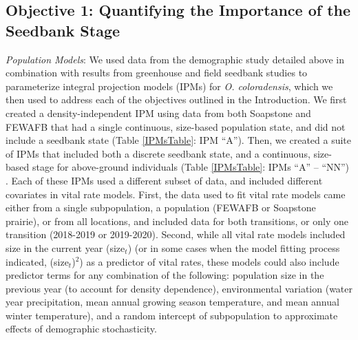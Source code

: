 \documentclass[12pt, letterpaper]{article}
\begin{document}
\subsection{Objective 1: Quantifying the Importance of the Seedbank Stage}

\textit{Population Models}: We used data from the demographic study detailed above in combination with results from greenhouse and field seedbank studies to parameterize integral projection models (IPMs) for \textit{O. coloradensis}, which we then used to address each of the objectives outlined in the Introduction. We first created a density-independent IPM using data from both Soapstone and FEWAFB that had a single continuous, size-based population state, and did not include a seedbank state (Table \ref{IPMsTable}: IPM “A”). Then, we created a suite of IPMs that included both a discrete seedbank state, and a continuous, size-based stage for above-ground individuals (Table \ref{IPMsTable}: IPMs “A” – “NN”) \cite{Ellner2006IntegralDemography, Rees2006, Paniw2017}.  Each of these IPMs used a different subset of data, and included different covariates in vital rate models. First, the data used to fit vital rate models came either from a single subpopulation, a population (FEWAFB or Soapstone prairie), or from all locations, and included data for both transitions, or only one transition (2018-2019 or 2019-2020). Second, while all vital rate models included size in the current year (size$_t$)  (or in some cases when the model fitting process indicated, (size$_t$)$^2$) as a predictor of vital rates, these models could also include predictor terms for any combination of the following: population size in the previous year (to account for density dependence), environmental variation (water year precipitation, mean annual growing season temperature, and mean annual winter temperature), and a random intercept of subpopulation to approximate effects of demographic stochasticity.  
\end{document}
